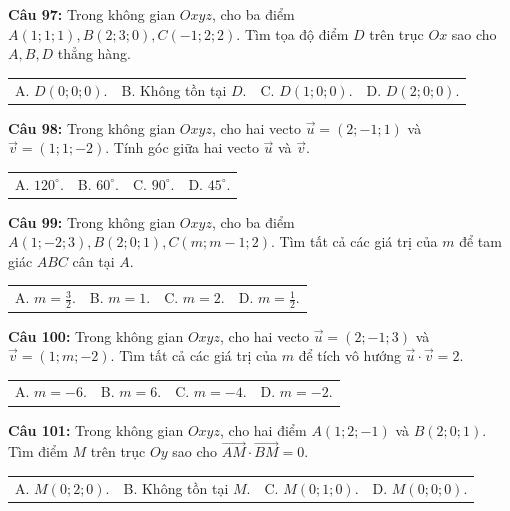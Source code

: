 \documentclass[12pt]{article}
\begin{document}
	\vspace{2mm}
	\noindent \textbf{Câu 97:} Trong không gian $Oxyz$, cho ba điểm $A(1; 1; 1), B(2; 3; 0), C(-1; 2; 2)$. Tìm tọa độ điểm $D$ trên trục $Ox$ sao cho $A, B, D$ thẳng hàng. \\
	\noindent
	\begin{tabular}{p{} p{} p{} p{}}
		A. $D(0; 0; 0)$. & B. Không tồn tại $D$. & C. $D(1; 0; 0)$. & D. $D(2; 0; 0)$.
	\end{tabular}
	
	\vspace{2mm}
	\noindent \textbf{Câu 98:} Trong không gian $Oxyz$, cho hai vecto $\vec{u} = (2; -1; 1)$ và $\vec{v} = (1; 1; -2)$. Tính góc giữa hai vecto $\vec{u}$ và $\vec{v}$. \\
	\noindent
	\begin{tabular}{p{} p{} p{} p{}}
		A. $120^\circ$. & B. $60^\circ$. & C. $90^\circ$. & D. $45^\circ$.
	\end{tabular}
	
	\vspace{2mm}
	\noindent \textbf{Câu 99:} Trong không gian $Oxyz$, cho ba điểm $A(1; -2; 3), B(2; 0; 1), C(m; m-1; 2)$. Tìm tất cả các giá trị của $m$ để tam giác $ABC$ cân tại $A$. \\
	\noindent
	\begin{tabular}{p{} p{} p{} p{}}
		A. $m = \frac{3}{2}$. & B. $m = 1$. & C. $m = 2$. & D. $m = \frac{1}{2}$.
	\end{tabular}
	
	\noindent \textbf{Câu 100:} Trong không gian $Oxyz$, cho hai vecto $\vec{u} = (2; -1; 3)$ và $\vec{v} = (1; m; -2)$. Tìm tất cả các giá trị của $m$ để tích vô hướng $\vec{u} \cdot \vec{v} = 2$. \\
	\noindent
	\begin{tabular}{p{} p{} p{} p{}}
		A. $m = -6$. & B. $m = 6$. & C. $m = -4$. & D. $m = -2$.
	\end{tabular}
	
	\vspace{2mm}
	\noindent \textbf{Câu 101:} Trong không gian $Oxyz$, cho hai điểm $A(1; 2; -1)$ và $B(2; 0; 1)$. Tìm điểm $M$ trên trục $Oy$ sao cho $\vec{AM} \cdot \vec{BM} = 0$. \\
	\noindent
	\begin{tabular}{p{} p{} p{} p{}}
		A. $M(0; 2; 0)$. & B. Không tồn tại $M$. & C. $M(0; 1; 0)$. & D. $M(0; 0; 0)$.
	\end{tabular}
	
\end{document}
